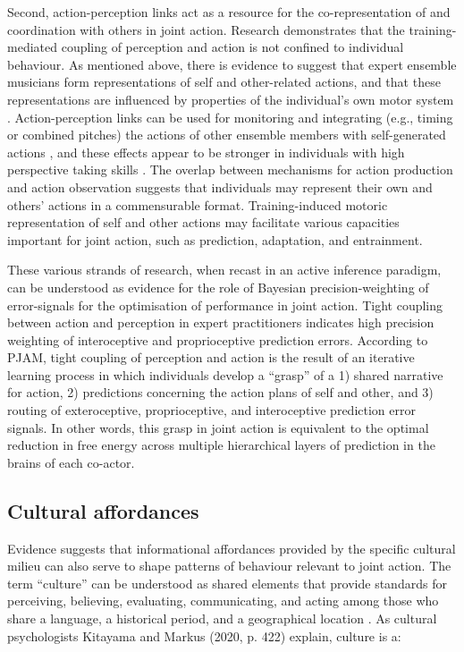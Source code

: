 \begin{CJK}{UTF8}{gbsn}
Second, action-perception links act as a resource for the co-representation of and coordination with others in joint action.
Research demonstrates that the training-mediated coupling of perception and action is not confined to individual behaviour.  As mentioned above, there is evidence to suggest that expert ensemble musicians form representations of self and other-related actions, and that these representations are influenced by properties of the individual’s own motor system \citep{Novembre2012}.  Action-perception links can be used for monitoring and integrating (e.g., timing or combined pitches) the actions of other ensemble members with self-generated actions \citep{Loehr2013}, and these effects appear to be stronger in individuals with high perspective taking skills \citep{Novembre2012,Loehr2013}.  The overlap between mechanisms for action production and action observation suggests that individuals may represent their own and others’ actions in a commensurable format.  Training-induced motoric representation of self and other actions may facilitate various capacities important for joint action, such as prediction, adaptation, and entrainment.

These various strands of research, when recast in an active inference paradigm, can be understood as evidence for the role of Bayesian precision-weighting of error-signals for the optimisation of performance in joint action.  Tight coupling between action and perception in expert practitioners indicates high precision weighting of interoceptive and proprioceptive prediction errors.   According to PJAM, tight coupling of perception and action is the result of an iterative learning process in which individuals develop a ``grasp'' of a 1) shared narrative for action, 2) predictions concerning the action plans of self and other, and 3) routing of exteroceptive, proprioceptive, and interoceptive prediction error signals.  In other words, this grasp in joint action is equivalent to the optimal reduction in free energy across multiple hierarchical layers of prediction in the brains of each co-actor.




  \subsection{Cultural affordances}

Evidence suggests that informational affordances provided by the specific cultural milieu can also serve to shape patterns of behaviour relevant to joint action.  The term ``culture'' can be understood as shared elements that provide standards for perceiving, believing, evaluating, communicating, and acting among those who share a language, a historical period, and a geographical location \citep{Triandis1996}.  As cultural psychologists Kitayama and Markus (2020, p. 422) explain, culture is a:


\end{CJK}
